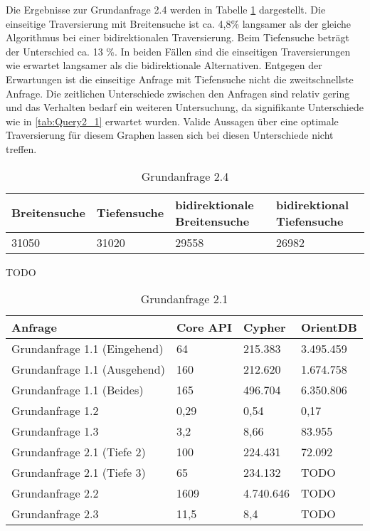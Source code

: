 \FloatBarrier
Die Ergebnisse zur Grundanfrage 2.4 werden in Tabelle \ref{tab:Query2_4} dargestellt. Die einseitige Traversierung mit Breitensuche ist ca. 4,8\% langsamer als der gleiche Algorithmus bei einer bidirektionalen Traversierung. Beim Tiefensuche beträgt der Unterschied ca. 13 \%. In beiden Fällen sind die einseitigen Traversierungen wie erwartet langsamer als die bidirektionale Alternativen. Entgegen der Erwartungen ist die einseitige Anfrage mit Tiefensuche nicht die zweitschnellste Anfrage.  
Die zeitlichen Unterschiede zwischen den Anfragen sind relativ gering und das Verhalten bedarf ein weiteren Untersuchung, da signifikante Unterschiede wie in \ref{tab:Query2_1} erwartet wurden. Valide Aussagen über eine optimale Traversierung für diesem Graphen lassen sich bei diesen Unterschiede nicht treffen.    
\FloatBarrier
\begin{table}[!htb]
	\centering
	\begin{tabular}{ |p{3cm}|p{3cm}|p{3cm}|p{3cm}|  }
		\hline
		Breitensuche & Tiefensuche&bidirektionale Breitensuche &bidirektional Tiefensuche\\
		\hline
		 31050 & 31020    &  29558  &  26982\\
		\hline
	\end{tabular}
	\caption{Grundanfrage 2.4}
	\label{tab:Query2_4}
\end{table}
\FloatBarrier
TODO
\FloatBarrier
\begin{table}[h]
	\centering
	\begin{tabular}{ |p{6cm}||p{2cm}|p{2cm}|p{2cm}|  }
		\hline
		Anfrage& Core API & Cypher & OrientDB \\
		\hline
	Grundanfrage 1.1 (Eingehend)   &  64   & 215.383 & 3.495.459\\
	Grundanfrage 1.1 (Ausgehend)  & 160   & 212.620 & 1.674.758\\
	Grundanfrage 1.1 (Beides)  & 165  & 496.704 & 6.350.806\\
	Grundanfrage 1.2  & 0,29 & 0,54 & 0,17   \\
	Grundanfrage 1.3  & 3,2  & 8,66& 83.955   \\
	Grundanfrage 2.1 (Tiefe 2)  & 100 & 224.431 & 72.092   \\
	Grundanfrage 2.1 (Tiefe 3) & 65  & 234.132& TODO   \\
	Grundanfrage 2.2  & 1609 & 4.740.646 & TODO   \\
	Grundanfrage 2.3  & 11,5 & 8,4  & TODO   \\
		\hline
	\end{tabular}
	\caption{Grundanfrage 2.1}
\end{table}
\FloatBarrier
